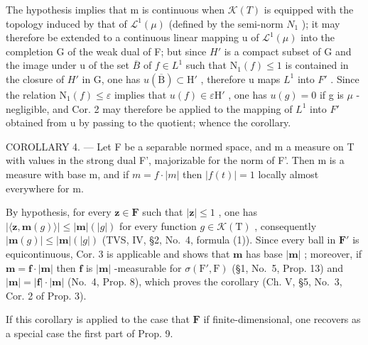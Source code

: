 The hypothesis implies that m is continuous when \(\mathcal{K}(T)\) is equipped with the topology induced by that of \(\mathcal{L}^{1}(\mu)\) (defined by the semi-norm \(N_{1}\) ); it may therefore be extended to a continuous linear mapping u of \(\mathcal{L}^{1}(\mu)\) into the completion G of the weak dual of F; but since \(H'\) is a compact subset of G and the image under u of the set \(\overline{B}\) of \(f \in L^{1}\) such that \(\mathrm{N}_{1}(f) \leqslant 1\) is contained in the closure of \(H'\) in G, one has \(u(\overline{\mathrm{B}}) \subset \mathrm{H}'\) , therefore u maps \(L^{1}\) into \(F'\) . Since the relation \(\mathrm{N}_{1}(f) \leqslant \varepsilon\) implies that \(u(f) \in \varepsilon\mathrm{H}'\) , one has \(u(g) = 0\) if g is \(\mu\) -negligible, and Cor. 2 may therefore be applied to the mapping of \(L^{1}\) into \(F'\) obtained from u by passing to the quotient; whence the corollary.

COROLLARY 4. --- Let F be a separable normed space, and m a measure on T with values in the strong dual F', majorizable for the norm of F'. Then m is a measure with base \textbar m\textbar, and if \(m = f \cdot |m|\) then \(|f(t)| = 1\) locally almost everywhere for \textbar m\textbar.

By hypothesis, for every \(\mathbf{z} \in \mathbf{F}\) such that \(|\mathbf{z}| \leqslant 1\) , one has \(|\langle \mathbf{z}, \mathbf{m}(g) \rangle| \leqslant |\mathbf{m}|(|g|)\) for every function \(g \in \mathcal{K}(\mathrm{T})\) , consequently \(|\mathbf{m}(g)| \leqslant |\mathbf{m}|(|g|)\) (TVS, IV, §2, No.~4, formula (1)). Since every ball in \(\mathbf{F}'\) is equicontinuous, Cor. 3 is applicable and shows that \(\mathbf{m}\) has base \(|\mathbf{m}|\) ; moreover, if \(\mathbf{m} = \mathbf{f} \cdot |\mathbf{m}|\) then \(\mathbf{f}\) is \(|\mathbf{m}|\) -measurable for \(\sigma(\mathrm{F}', \mathrm{F})\) (§1, No.~5, Prop. 13) and \(|\mathbf{m}| = |\mathbf{f}| \cdot |\mathbf{m}|\) (No.~4, Prop. 8), which proves the corollary (Ch. V, §5, No.~3, Cor. 2 of Prop. 3).

If this corollary is applied to the case that \(\mathbf{F}\) if finite-dimensional, one recovers as a special case the first part of Prop. 9.

